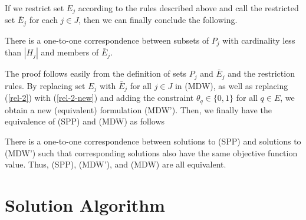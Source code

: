 \documentclass[graybox]{./styles/svmult}
\begin{document}
If we restrict set $E_j$ according to the rules described above and call the
restricted set $\bar{E}_j$ for each $j \in J$, then we can finally
conclude the following.
\begin{proposition}
\label{dw-prop-p1}
There is a one-to-one correspondence between subsets of $P_j$ with
cardinality less than $|H_j|$ and members of $\bar{E}_j$.
\end{proposition}
The proof follows easily from the definition of sets $P_j$ and $\bar{E}_j$
and the restriction rules. By replacing set $E_j$ with $\bar{E}_j$
for all $j \in J$ in (MDW), as well as replacing (\ref{rel-2}) with
(\ref{rel-2-new}) and adding the constraint $\theta_q \in \{0, 1\}$ for
all $q \in E$, we obtain a new (equivalent) formulation (MDW'). Then,
we finally have the equivalence of (SPP) and (MDW) as follows
\begin{proposition}
\label{dw-prop-p2}
There is a one-to-one correspondence between solutions to (SPP)
and solutions to (MDW') such that corresponding solutions also have the
same objective function value. Thus, (SPP), (MDW'), and (MDW) are all
equivalent.
\end{proposition}

\section{Solution Algorithm}
\label{sec:SolAlg}
\end{document}
